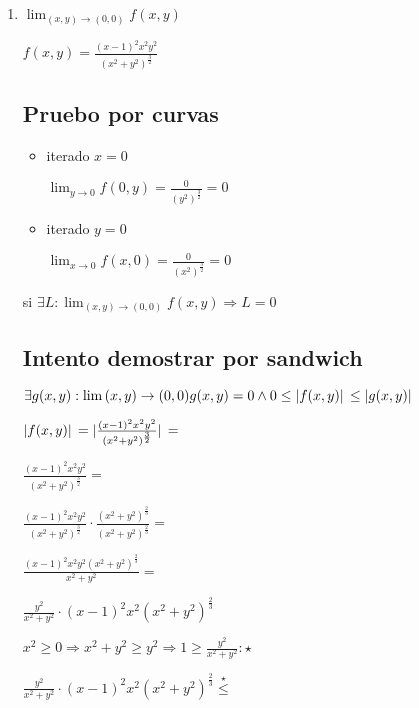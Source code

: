 \documentclass[../parcial.tex]{subfiles}
\begin{document}
    \begin{enumerate}
        \item $ \lim_{(x,y) \to (0,0)} f(x,y) $

            $f(x,y) = \frac{(x-1)^2x^2y^2}{(x^2+y^2)^{\frac{3}{2}}}$

            \subsection*{Pruebo por curvas}

            \begin{itemize}
                \item iterado $x = 0$

                    $\lim_{y\to0} f(0,y) = \frac{0}{(y^2)^{\frac{3}{2}}} = 0$

                \item iterado $y = 0$

                    $\lim_{x\to0} f(x,0) = \frac{0}{(x^2)^{\frac{3}{2}}} = 0$

            \end{itemize}

            si $\exists L: \lim_{(x,y) \to (0,0)} f(x,y) \Rightarrow L = 0 $

            \subsection*{Intento demostrar por sandwich}
        
            $ \exists g(x,y): \lim{(x,y)\to(0,0)} g(x,y) = 0 \wedge 0 \leq \abs*{f(x,y)} \leq \abs*{g(x,y)} $

            $ \abs*{f(x,y)} = \abs*{\frac{(x-1)^2x^2y^2}{(x^2+y^2)^{\frac{3}{2}}}} = $

            $ \frac{(x-1)^2x^2y^2}{(x^2+y^2)^{\frac{3}{2}}} =  $

            $ \frac{(x-1)^2x^2y^2}{(x^2+y^2)^{\frac{3}{2}}} \cdot \frac{(x^2+y^2)^{\frac{2}{3}}}{(x^2+y^2)^{\frac{2}{3}}} = $

            $ \frac{(x-1)^2x^2y^2(x^2+y^2)^{\frac{2}{3}}}{x^2+y^2} = $

            $ \frac{y^2}{x^2+y^2} \cdot (x-1)^2x^2(x^2+y^2)^{\frac{2}{3}} $

            \qquad $ x^2 \geq 0 \Rightarrow x^2 + y^2 \geq y^2 \Rightarrow 1 \geq \frac{y^2}{x^2 + y^2} : \star $

            $ \frac{y^2}{x^2+y^2} \cdot (x-1)^2x^2(x^2+y^2)^{\frac{2}{3}} \stackrel{\star}{\leq}$


\end{enumerate}
\end{document}
